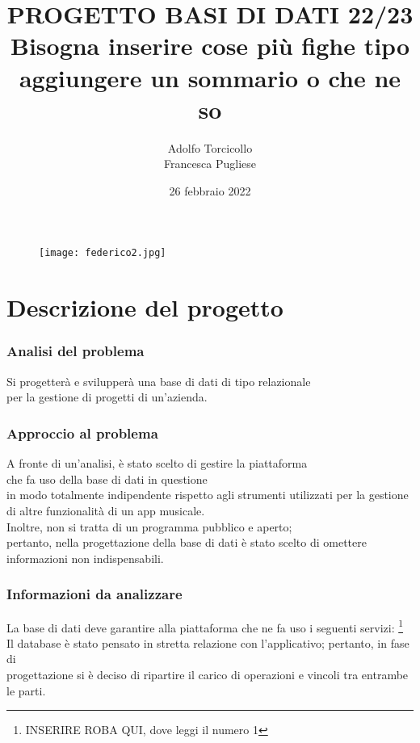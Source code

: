 \documentclass[11pt]{article}
\title{PROGETTO BASI DI DATI 22/23 \\ Bisogna inserire cose più fighe tipo aggiungere un sommario o che ne so }
\author{Adolfo Torcicollo \\ Francesca Pugliese}
\date{26 febbraio 2022}
\begin{document}
	\begin{figure}
		\centering
		\texttt{[image: federico2.jpg]}
		\maketitle
	\end{figure}

	\clearpage

	\part{Descrizione del progetto}
	\section{Analisi del problema}
	
	Si progetterà e svilupperà una base di dati di tipo relazionale\\ per la gestione di progetti di un’azienda. \\
	
	\section{Approccio al problema}
	
	A fronte di un’analisi, è stato scelto di gestire la piattaforma\\ che fa uso della base di dati in questione \\
	in modo totalmente indipendente rispetto agli strumenti utilizzati per la gestione di altre funzionalità di un app musicale.\\
	Inoltre, non si tratta di un programma pubblico e aperto;\\ pertanto, nella progettazione della base di dati è stato scelto di omettere 
	informazioni non indispensabili.\\
	
	\section{Informazioni da analizzare}
	
	La base di dati deve garantire alla piattaforma che ne fa uso i seguenti servizi:
	\footnote{INSERIRE ROBA QUI, dove leggi il numero 1}
	Il database è stato pensato in stretta relazione con l’applicativo; pertanto, in fase di \\ 
	progettazione si è deciso di ripartire il carico di operazioni e vincoli tra entrambe le parti.\\
	
\end{document}
